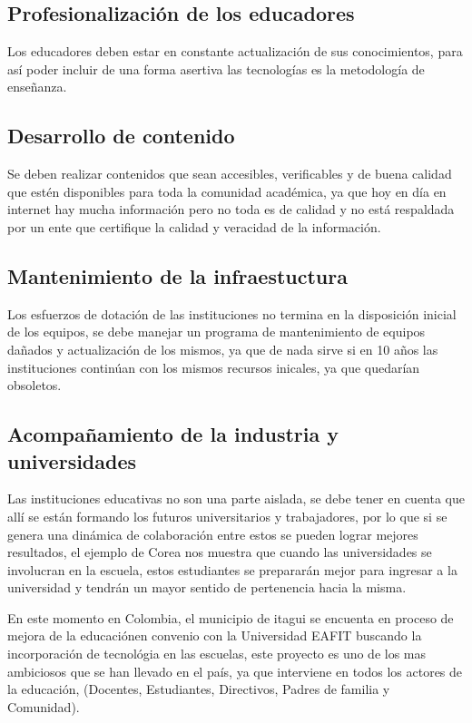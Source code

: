 \documentclass[conference]{IEEEtran}
\begin{document}
\subsection{Profesionalización de los educadores} 
Los educadores deben estar en constante actualización de sus conocimientos, para así poder incluir de una forma asertiva las tecnologías es la metodología de enseñanza.

\subsection{Desarrollo de contenido}
Se deben realizar contenidos que sean accesibles, verificables y de buena calidad que estén disponibles para toda la comunidad académica, ya que hoy en día en internet hay mucha información pero no toda es de calidad y no está respaldada por un ente que certifique la calidad y veracidad de la información.

\subsection{Mantenimiento de la infraestuctura}
Los esfuerzos de dotación de las instituciones no termina en la disposición inicial de los equipos, se debe manejar un programa de mantenimiento de equipos dañados y actualización de los mismos, ya que de nada sirve si en 10 años las instituciones continúan con los mismos recursos inicales, ya que quedarían obsoletos.

\subsection{Acompañamiento de la industria y universidades}   
Las instituciones educativas no son una parte aislada, se debe tener en cuenta que allí se están formando los futuros universitarios y trabajadores, por lo que si se genera una dinámica de colaboración entre estos se pueden lograr mejores resultados, el ejemplo de Corea nos muestra que cuando las universidades se involucran en la escuela, estos estudiantes se prepararán mejor para ingresar a la universidad y tendrán un mayor sentido de pertenencia hacia la misma. 


En este momento en Colombia, el municipio de itagui se encuenta en proceso de mejora de la educaciónen convenio con la Universidad EAFIT buscando la incorporación de tecnológia en las escuelas\cite{teso}, este proyecto es uno de los mas ambiciosos que se han llevado en el país, ya que interviene en todos los actores de la educación, (Docentes, Estudiantes, Directivos, Padres de familia y Comunidad).
\end{document}
